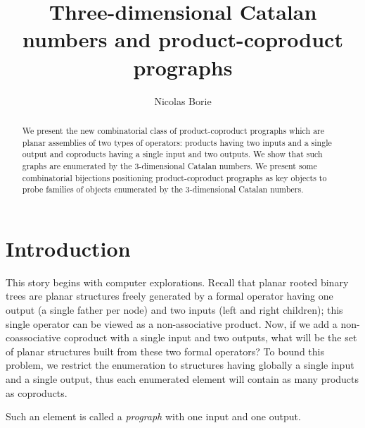 \documentclass{amsart}
\title{Three-dimensional Catalan numbers and product-coproduct prographs}
\author{Nicolas Borie}
\begin{document}
\maketitle


\begin{abstract}
  We present the new combinatorial class of product-coproduct
  prographs which are planar assemblies of two types of operators:
  products having two inputs and a single output and coproducts having
  a single input and two outputs. We show that such graphs are enumerated
  by the $3$-dimensional Catalan numbers. We present some
  combinatorial bijections positioning product-coproduct prographs as key
  objects to probe families of objects enumerated by the $3$-dimensional
  Catalan numbers.
\end{abstract}


\section{Introduction}


This story begins with computer explorations. Recall that planar
rooted binary trees are planar structures freely generated by a formal
operator having one output (a single father per node) and two inputs
(left and right children); this single operator can be viewed as a
non-associative product. Now, if we add a non-coassociative coproduct
with a single input and two outputs, what will be the set of planar
structures built from these two formal operators? To bound this
problem, we restrict the enumeration to structures having globally a
single input and a single output, thus each enumerated element will
contain as many products as coproducts.

Such an element is called a
\emph{prograph} with one input and one output.
\end{document}
